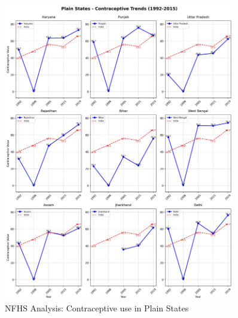 \begin{figure}[H]
    \centering
    \includegraphics[width=0.9\textwidth]{figures/nfhs/plain_states_contraceptive_subplots.pdf}
    \caption{NFHS Analysis: Contraceptive use in Plain States}
    \label{fig:nfhs_plain_contraceptive}
\end{figure}

